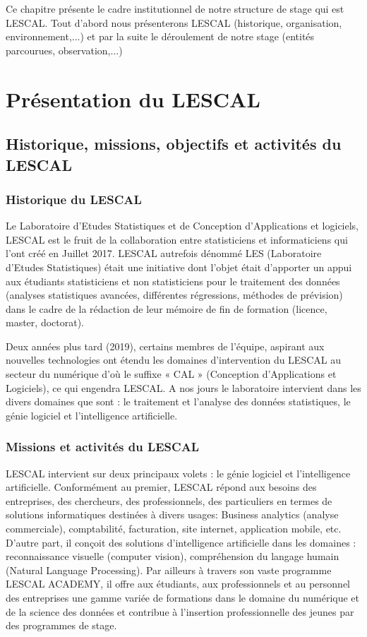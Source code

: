 
\par{
    Ce chapitre présente le cadre institutionnel de notre structure de 
    stage qui est \\LESCAL. Tout d'abord nous présenterons LESCAL (historique, organisation,
    environnement,...) et par la suite le déroulement de notre stage (entités parcourues,
    observation,...)

}

\section{Présentation du LESCAL}
\subsection{ Historique, missions, objectifs et activités du LESCAL}

\subsubsection{Historique du LESCAL}
Le Laboratoire d'Etudes Statistiques et de Conception d'Applications et logiciels,
LESCAL est le fruit de la collaboration entre statisticiens et informaticiens qui
l'ont créé en Juillet 2017. LESCAL autrefois dénommé LES (Laboratoire d'Etudes 
Statistiques) était une initiative dont l'objet était d'apporter un appui aux 
étudiants statisticiens et non statisticiens pour le traitement des données 
(analyses statistiques avancées, différentes régressions, méthodes de prévision) 
dans le cadre de la rédaction de leur mémoire de fin de formation
(licence, master, doctorat).

Deux années plus tard (2019), certains membres de l'équipe, aspirant aux nouvelles
technologies ont étendu les domaines d'intervention du LESCAL au secteur du numérique 
d'où le suffixe « CAL » (Conception d'Applications et Logiciels), ce qui engendra LESCAL.
A nos jours le laboratoire intervient dans les divers domaines que sont : le traitement
et l'analyse des données statistiques, le génie logiciel et l'intelligence artificielle.


\subsubsection{Missions et activités du LESCAL}
LESCAL intervient sur deux principaux volets : le génie logiciel et l'intelligence 
artificielle. Conformément au premier, LESCAL répond aux besoins des entreprises, des 
chercheurs, des professionnels, des particuliers en termes de solutions informatiques 
destinées à divers usages: Business analytics (analyse commerciale), comptabilité, 
facturation, site internet, application mobile, etc.  D'autre part, il conçoit des 
solutions d'intelligence artificielle dans les domaines : reconnaissance visuelle 
(computer vision), compréhension du langage humain (Natural Language Processing).
Par ailleurs à travers son vaste programme LESCAL ACADEMY, il offre aux étudiants,
aux professionnels et au personnel des entreprises une gamme variée de formations 
dans le domaine du numérique et de la science des données et contribue à l'insertion
professionnelle des jeunes par des programmes de stage.


